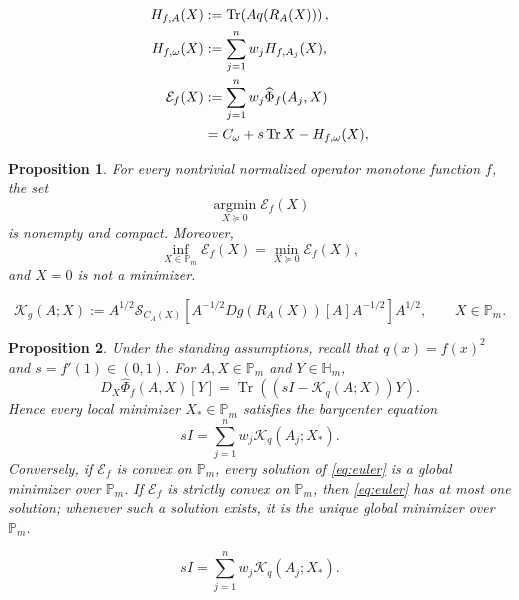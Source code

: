 \documentclass[10pt,a4paper]{amsart}
\newtheorem{proposition}{Proposition}
\newcommand{\Hm}{\mathbb H_m}
\newcommand{\Pm}{\mathbb P_m}
\newcommand{\Tr}{\operatorname{Tr}}
\newcommand{\altPhi}{\widehat{\Phi}}
\begin{document}
	\begin{align}
		H_{f,A}(X)
		&:=\Tr\!\left(Aq(R_A(X))\right), \label{eq:HfA}\\
		H_{f,\omega}(X)
		&:=\sum_{j=1}^n w_jH_{f,A_j}(X), \label{eq:Hfomega}\\
		\mathcal E_f(X)
		&:=\sum_{j=1}^n w_j\altPhi_f(A_j,X) \notag\\
		&=C_\omega+s\Tr X-H_{f,\omega}(X), \label{eq:energy}
	\end{align}

\begin{proposition}
		\label{prop:closed-cone}
		For every nontrivial normalized operator monotone function $f$, the set
		\[
		\operatorname*{argmin}_{X\succeq0}\mathcal E_f(X)
		\]
		is nonempty and compact.  Moreover,
		\begin{equation}\label{eq:open-closed}
			\inf_{X\in\Pm}\mathcal E_f(X)
			=\min_{X\succeq0}\mathcal E_f(X),
		\end{equation}
		and $X=0$ is not a minimizer.
	\end{proposition}

	\begin{equation}\label{eq:Kg}
		\mathcal K_g(A;X)
		:=A^{1/2}\mathcal S_{C_A(X)}\!\left[
		A^{-1/2}Dg(R_A(X))[A]A^{-1/2}
		\right]A^{1/2},
		\qquad X\in\Pm.
	\end{equation}

 \begin{proposition}
		\label{prop:euler}
		Under the standing assumptions, recall that $q(x)=f(x)^2$ and
		$s=f'(1)\in(0,1)$.  For $A,X\in\Pm$ and $Y\in\Hm$,
		\begin{equation}\label{eq:first-variation}
			D_X\altPhi_f(A,X)[Y]
			=\Tr\!\left((sI-\mathcal K_q(A;X))Y\right).
		\end{equation}
		Hence every local minimizer $X_*\in\Pm$ satisfies the barycenter equation
		\begin{equation}\label{eq:euler}
			sI=\sum_{j=1}^n w_j\mathcal K_q(A_j;X_*).
		\end{equation}
		Conversely, if $\mathcal E_f$ is convex on $\Pm$, every solution of
		\eqref{eq:euler} is a global minimizer over $\Pm$.  If $\mathcal E_f$ is
		strictly convex on $\Pm$, then \eqref{eq:euler} has at most one solution;
		whenever such a solution exists, it is the unique global minimizer over
		$\Pm$.
\end{proposition}

		\begin{equation}
			sI=\sum_{j=1}^n w_j\mathcal K_q(A_j;X_*).
		\end{equation}
\end{document}
